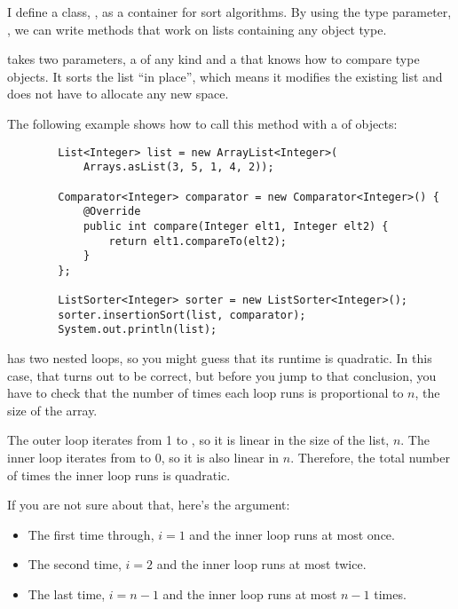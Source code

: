 \documentclass[12pt]{book}
\theoremstyle{exercise}
\begin{document}
I define a class, , as a container for sort
algorithms. By using the type parameter, , we can write
methods that work on lists containing any object type.


 takes two parameters, a  of any kind
and a  that knows how to compare type 
objects. It sorts the list ``in place'', which means it modifies the
existing list and does not have to allocate any new space.


The following example shows how to call this method with a  of
 objects:

\begin{verbatim}
        List<Integer> list = new ArrayList<Integer>(
            Arrays.asList(3, 5, 1, 4, 2));

        Comparator<Integer> comparator = new Comparator<Integer>() {
            @Override
            public int compare(Integer elt1, Integer elt2) {
                return elt1.compareTo(elt2);
            }
        };

        ListSorter<Integer> sorter = new ListSorter<Integer>();
        sorter.insertionSort(list, comparator);
        System.out.println(list);
\end{verbatim}

 has two nested loops, so you might guess that
its runtime is quadratic. In this case, that turns out to be correct,
but before you jump to that conclusion, you have to check that the
number of times each loop runs is proportional to $n$, the size
of the array.


The outer loop iterates from 1 to , so it is linear
in the size of the list, $n$.
The inner loop iterates from  to 0, so it is also linear in $n$.
Therefore, the total number of times the inner loop runs is quadratic.


If you are not sure about that, here's the argument:

\begin{itemize}

\item
  The first time through, $i=1$ and the inner loop runs at most
  once.

\item
  The second time, $i=2$ and the inner loop runs at most twice.

\item
  The last time, $i=n-1$ and the inner loop runs at most
  $n-1$ times.

\end{itemize}
\end{document}
